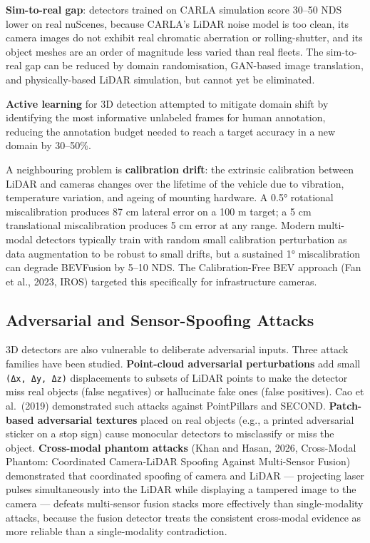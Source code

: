 \documentclass{article}
\begin{document}
\textbf{Sim-to-real gap}: detectors trained on CARLA simulation score 30--50 NDS lower on real nuScenes, because CARLA's LiDAR noise model is too clean, its camera images do not exhibit real chromatic aberration or rolling-shutter, and its object meshes are an order of magnitude less varied than real fleets. The sim-to-real gap can be reduced by domain randomisation, GAN-based image translation, and physically-based LiDAR simulation, but cannot yet be eliminated.

\textbf{Active learning} for 3D detection \citep{lin2023sparse4dv2recurren} attempted to mitigate domain shift by identifying the most informative unlabeled frames for human annotation, reducing the annotation budget needed to reach a target accuracy in a new domain by 30--50\%.

A neighbouring problem is \textbf{calibration drift}: the extrinsic calibration between LiDAR and cameras changes over the lifetime of the vehicle due to vibration, temperature variation, and ageing of mounting hardware. A 0.5° rotational miscalibration produces 87 cm lateral error on a 100 m target; a 5 cm translational miscalibration produces 5 cm error at any range. Modern multi-modal detectors typically train with random small calibration perturbation as data augmentation to be robust to small drifts, but a sustained 1° miscalibration can degrade BEVFusion by 5--10 NDS. The Calibration-Free BEV approach (Fan et al., 2023, IROS) targeted this specifically for infrastructure cameras.

\subsection{Adversarial and Sensor-Spoofing Attacks}\label{adversarial-and-sensor-spoofing-attacks}

3D detectors are also vulnerable to deliberate adversarial inputs. Three attack families have been studied. \textbf{Point-cloud adversarial perturbations} add small \texttt{(Δx,\ Δy,\ Δz)} displacements to subsets of LiDAR points to make the detector miss real objects (false negatives) or hallucinate fake ones (false positives). Cao et al.~(2019) demonstrated such attacks against PointPillars and SECOND. \textbf{Patch-based adversarial textures} placed on real objects (e.g., a printed adversarial sticker on a stop sign) cause monocular detectors to misclassify or miss the object. \textbf{Cross-modal phantom attacks} (Khan and Hasan, 2026, Cross-Modal Phantom: Coordinated Camera-LiDAR Spoofing Against Multi-Sensor Fusion) demonstrated that coordinated spoofing of camera and LiDAR --- projecting laser pulses simultaneously into the LiDAR while displaying a tampered image to the camera --- defeats multi-sensor fusion stacks more effectively than single-modality attacks, because the fusion detector treats the consistent cross-modal evidence as more reliable than a single-modality contradiction.
\end{document}
